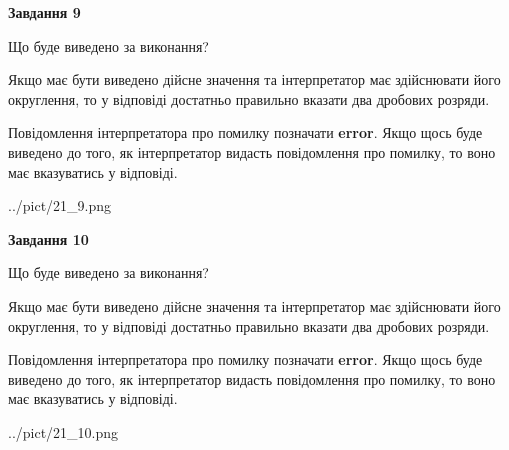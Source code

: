 \documentclass[12pt, ukrainian]{article}
\begin{document}
{\begin {Large}
{\begin {center}\textbf{Завдання 9}\end {center}}\par
Що буде виведено за виконання? \par

Якщо має бути виведено дійсне значення та інтерпретатор має здійснювати його округлення, 
то у відповіді достатньо правильно вказати два дробових розряди.

Повідомлення інтерпретатора про помилку позначати \textbf{error}.
Якщо щось буде виведено до того, як інтерпретатор видасть повідомлення про помилку, 
то воно має вказуватись у відповіді. \par

\begin{center}
	{../pict/21_9.png}
\end{center}
\newpage

{\begin {center}\textbf{Завдання 10}\end {center}}\par
Що буде виведено за виконання? \par

Якщо має бути виведено дійсне значення та інтерпретатор має здійснювати його округлення, 
то у відповіді достатньо правильно вказати два дробових розряди.

Повідомлення інтерпретатора про помилку позначати \textbf{error}.
Якщо щось буде виведено до того, як інтерпретатор видасть повідомлення про помилку, 
то воно має вказуватись у відповіді. \par

\begin{center}
	{../pict/21_10.png}
\end{center}
\newpage

\end {Large}}
\end{document}
